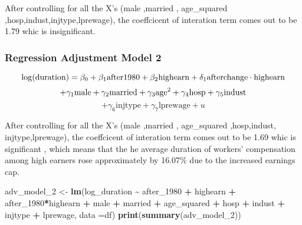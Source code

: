 \documentclass[
]{article}
\newenvironment{Shaded}{\begin{snugshade}}{\end{snugshade}}
\newcommand{\AttributeTok}[1]{\textcolor[rgb]{0.13,0.29,0.53}{#1}}
\newcommand{\FunctionTok}[1]{\textcolor[rgb]{0.13,0.29,0.53}{\textbf{#1}}}
\newcommand{\NormalTok}[1]{#1}
\newcommand{\OtherTok}[1]{\textcolor[rgb]{0.56,0.35,0.01}{#1}}
\newcommand{\SpecialCharTok}[1]{\textcolor[rgb]{0.81,0.36,0.00}{\textbf{#1}}}
\begin{document}
After controlling for all the X's (male ,married , age\_squared
,hosp,indust,injtype,lprewage), the coeffcicent of interation term comes
out to be 1.79 whic is insignificant.

\subsubsection{Regression Adjustment Model
2}\label{regression-adjustment-model-2}

\[
\log(\text{duration}) = \beta_0 + \beta_1 \text{after1980} + \beta_2 \text{highearn} + \delta_1 \text{afterchange} \cdot \text{highearn} \\\]
\[
+ \gamma_1\text{male} + \gamma_2\text{married} + \gamma_3\text{age}^2 + \gamma_4\text{hosp} + \gamma_5\text{indust} \\\]
\[+ \gamma_6\text{injtype} + \gamma_7\text{lprewage}+ u\]

After controlling for all the X's (male ,married , age\_squared
,hosp,indust, injtype,lprewage), the coeffcicent of interation term
comes out to be 1.69 whic is significant , which means that the he
average duration of workers' compensation among high earners rose
approximately by 16.07\% due to the increased earnings cap.

\begin{Shaded}
\begin{Highlighting}[]
\NormalTok{adv\_model\_2 }\OtherTok{\textless{}{-}} \FunctionTok{lm}\NormalTok{(log\_duration }\SpecialCharTok{\textasciitilde{}}\NormalTok{ after\_1980 }\SpecialCharTok{+}\NormalTok{ highearn }\SpecialCharTok{+} 
\NormalTok{after\_1980}\SpecialCharTok{*}\NormalTok{highearn }\SpecialCharTok{+}\NormalTok{ male }\SpecialCharTok{+}\NormalTok{ married }\SpecialCharTok{+}\NormalTok{ age\_squared }\SpecialCharTok{+}\NormalTok{ hosp }
\SpecialCharTok{+}\NormalTok{ indust }\SpecialCharTok{+}\NormalTok{ injtype }\SpecialCharTok{+}\NormalTok{ lprewage, }\AttributeTok{data =}\NormalTok{df)}
\FunctionTok{print}\NormalTok{(}\FunctionTok{summary}\NormalTok{(adv\_model\_2))}
\end{Highlighting}
\end{Shaded}
\end{document}
